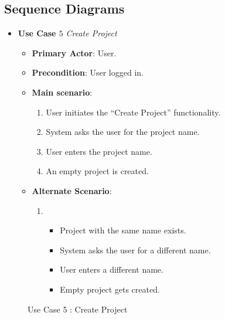 \documentclass{report}
\begin{document}
\subsection{Sequence Diagrams}
\begin{itemize}
    \item \textbf{Use Case $5$} \textit{Create Project
}\\
    \begin{itemize}
        \item \textbf{Primary Actor}: User.
        \item \textbf{Precondition}: User logged in.
        \item \textbf{Main scenario}: \begin{enumerate}
            \item User initiates the “Create Project” functionality. 
            \item System asks the user for the project name.
            \item User enters the project name.
            \item An empty project is created.
        \end{enumerate}
       \item \textbf{Alternate Scenario}: 
       \begin{enumerate}
           \item 
           \begin{itemize} 
           \item Project with the same name exists.
            \item System asks the user for a different name.
            \item User enters a different name.
            \item Empty project gets created.
           \end{itemize}
       \end{enumerate}
    \end{itemize}
\end{itemize} 
\begin{figure}[htp]
\caption{Use Case 5 : Create Project}
\end{figure}
\newpage
\end{document}
